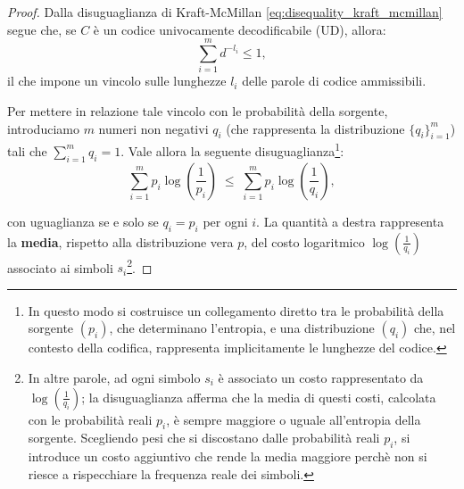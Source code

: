 \documentclass{article}
\theoremstyle{definition}
\numberwithin{equation}{section}
\begin{document}
\begin{proof}
    Dalla disuguaglianza di Kraft-McMillan \eqref{eq:disequality_kraft_mcmillan} segue che, se $C$ è un codice univocamente decodificabile (UD), allora:
    \[
        \sum_{i=1}^m d^{-l_i} \leq 1,
    \]
    il che impone un vincolo sulle lunghezze $l_i$ delle parole di codice ammissibili.

    Per mettere in relazione tale vincolo con le probabilità della sorgente, introduciamo $m$ numeri non negativi $q_i$ (che rappresenta la distribuzione $\{q_i\}_{i=1}^m$) tali che $\sum_{i=1}^m q_i = 1$. Vale allora la seguente disuguaglianza\footnote{In questo modo si costruisce un collegamento diretto tra le probabilità della sorgente $(p_i)$, che determinano l’entropia, e una distribuzione $(q_i)$ che, nel contesto della codifica, rappresenta implicitamente le lunghezze del codice.}:
    \begin{equation}\label{eq:teorema_shannon_dimostrazione_passaggio_3}
        \sum_{i=1}^m p_i \log\!\left(\frac{1}{p_i}\right)
        \;\leq\;
        \sum_{i=1}^m p_i \log\!\left(\frac{1}{q_i}\right),
    \end{equation}

    con uguaglianza se e solo se $q_i = p_i$ per ogni $i$. La quantità a destra rappresenta la \textbf{media}, rispetto alla distribuzione vera $p$, del costo logaritmico $\log\!\left(\frac{1}{q_i}\right)$ associato ai simboli $s_i$\footnote{In altre parole, ad ogni simbolo $s_i$ è associato un costo rappresentato da $\log\!\left(\frac{1}{q_i}\right)$; la disuguaglianza afferma che la media di questi costi, calcolata con le probabilità reali $p_i$, è sempre maggiore o uguale all'entropia della sorgente.
        Scegliendo pesi che si discostano dalle probabilità reali $p_i$, si introduce un costo aggiuntivo che rende la media maggiore perchè non si riesce a rispecchiare la frequenza reale dei simboli.}.


\end{proof}
\end{document}
